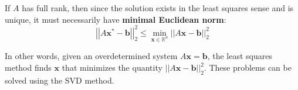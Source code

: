 \noindent
If $A$ has full rank, then since the solution exists in the least squares sense and is unique, it must necessarily have \textbf{minimal Euclidean norm}:
\begin{equation}\label{eq: minimal Euclidean norm}
    {\left|\left|A \mathbf{x}^{*} - \mathbf{b}\right|\right|}_{2}^{2} \le \underset{\mathbf{x} \in \mathbb{R}^{n}}{\min} {\left|\left|A\mathbf{x} - \mathbf{b}\right|\right|}_{2}^{2}
\end{equation}

\highspace
In other words, given an overdetermined system $A\mathbf{x} = \mathbf{b}$, the least squares method finds $\mathbf{x}$ that minimizes the quantity ${\left|\left|A\mathbf{x} - \mathbf{b}\right|\right|}_{2}^{2}$. These problems can be solved using the SVD method.
